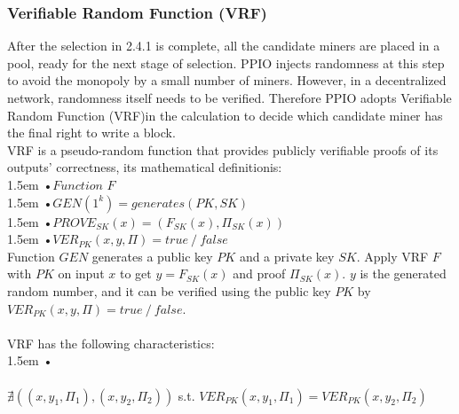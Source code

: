 \documentclass[10pt,a4paper]{article}
\begin{document}
                   
        \subsubsection{Verifiable Random Function (VRF)}  %
 \noindent 
After the selection in 2.4.1 is complete, all the candidate miners are placed in a pool, ready for the next stage of selection. PPIO injects randomness at this step to avoid the monopoly by a small number of miners. However, in a decentralized network, randomness itself needs to be verified. Therefore PPIO adopts Verifiable Random Function (VRF)\cite{article20}in the calculation to decide which candidate miner has the final right to write a block.
\vspace{-0.5em}
\\

\noindent  
VRF is a pseudo-random function that provides publicly verifiable proofs of its outputs' correctness\cite{article24}, 
 its mathematical definition\cite{article25}is:
 \vspace{-0.8em}
\\

\hangindent 1.5em
\noindent   
•\quad $Function$ $F$
\\
\hangindent 1.5em
\noindent   
•\quad $GEN\left(1^k\right)=generates\left(PK, SK\right)$
\\
\hangindent 1.5em
\noindent   
•\quad$PROVE_{SK}(x)=(F_{SK}(x), \Pi_{SK}(x))$
\\
\hangindent 1.5em
\noindent   
•\quad $VER_{PK}(x, y, \Pi)= true \mathbin{/} false$
\vspace{-0.5em}
\\

\noindent   
Function $GEN$ generates a public key $PK$ and a private key $SK$. Apply VRF $F$ with $PK$ on input $x$ to get $y=F_{SK}(x)$ and proof $\Pi_{SK}(x)$. $y$ is the generated random number, and it can be verified using the public key $PK$ by $VER_{PK}(x, y, \Pi)= true \mathbin{/} false$.
\vspace{-0.5em}
\\ \\VRF has the following characteristics:
\vspace{-0.8em}
\\

\hangindent 1.5em
\noindent   
•
\vspace{-0.8em}
\\ \\$\nexists((x, y_{1}, \Pi_{1}), (x, y_{2}, \Pi_{2}))$ s.t. $VER_{PK}(x, y_{1}, \Pi_{1})=VER_{PK}(x, y_{2}, \Pi_{2})$
\vspace{-0.8em}
\\
\end{document}

